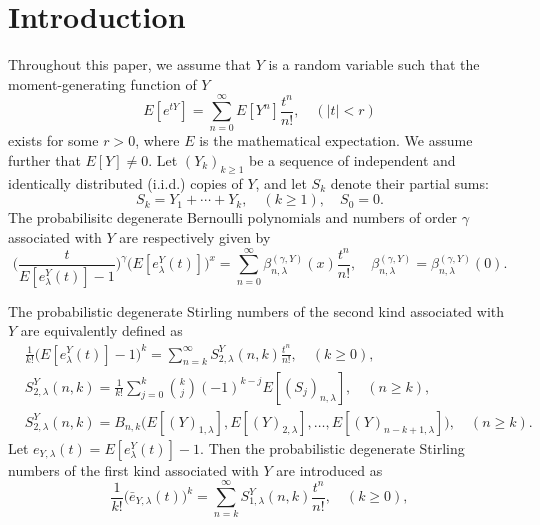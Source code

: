 \documentclass[a4paper,11pt]{amsart}
\begin{document}
\section{Introduction}
Throughout this paper, we assume that $Y$ is a random variable such that the moment-generating function of $Y$
\begin{equation} \label{20}
E[e^{tY}]=\sum_{n=0}^{\infty}E[Y^{n}]\frac{t^{n}}{n!}, \quad (|t|<r)
\end{equation}
exists for some $r > 0$, where $E$ is the mathematical expectation. We assume further that $E[Y] \ne 0$. Let $(Y_{k})_{k\ge 1}$ be a sequence of independent and identically distributed (i.i.d.) copies of $Y$, and let $S_{k}$ denote their partial sums:
\begin{equation} \label{21}
S_{k}=Y_{1}+\cdots+Y_{k}, \quad (k \ge 1), \quad S_{0}=0.
\end{equation}
The probabilisitc degenerate Bernoulli polynomials and numbers of order $\gamma$ associated with $Y$ are respectively given by
\begin{equation} \label{22}
\bigg(\frac{t}{E[e_{\lambda}^{Y}(t)]-1}\bigg)^{\gamma}\big(E[e_{\lambda}^{Y}(t)]\big)^{x}=\sum_{n=0}^{\infty}\beta_{n,\lambda}^{(\gamma,Y)}(x)\frac{t^{n}}{n!},\quad \beta_{n,\lambda}^{(\gamma,Y)}=\beta_{n,\lambda}^{(\gamma,Y)}(0).
\end{equation} \par
The probabilistic degenerate Stirling numbers of the second kind associated with $Y$ are equivalently defined as
\begin{equation} \label{23}
\begin{aligned}
&\frac{1}{k!}\big(E[e_{\lambda}^{Y}(t)]-1 \big)^{k}=\sum_{n=k}^{\infty}S_{2,\lambda}^{Y}(n,k)\frac{t^{n}}{n!}, \quad (k \ge 0),\\
&S_{2,\lambda}^{Y}(n,k)=\frac{1}{k!}\sum_{j=0}^{k}\binom{k}{j}(-1)^{k-j}E[(S_{j})_{n,\lambda}], \quad (n \ge k),\\
&S_{2,\lambda}^{Y}(n,k)=B_{n,k}\big(E[(Y)_{1,\lambda}],E[(Y)_{2,\lambda}],\dots,E[(Y)_{n-k+1,\lambda}]\big), \quad (n \ge k).
\end{aligned}
\end{equation}
Let $e_{Y,\lambda}(t)=E[e_{\lambda}^{Y}(t)]-1$. Then the probabilistic degenerate Stirling numbers of the first kind associated with $Y$ are introduced as
\begin{equation} \label{24}
\frac{1}{k!}\big(\bar{e}_{Y,\lambda}(t)\big)^{k}=\sum_{n=k}^{\infty}S_{1,\lambda}^{Y}(n,k)\frac{t^{n}}{n!},\quad (k \ge 0),
\end{equation}
\end{document}
